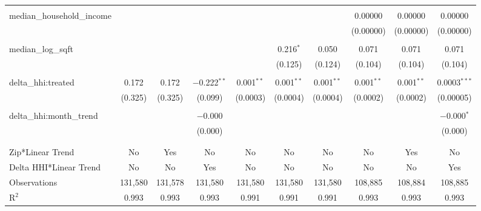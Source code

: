 \begin{table}[H]
{\begin{tabular}{@{\extracolsep{5pt}}lccccccccc}
   & & & & & & & & & \\  

  median\_household\_income &  &  &  &  &  &  & 0.00000 & 0.00000 & 0.00000 \\  

   &  &  &  &  &  &  & (0.00000) & (0.00000) & (0.00000) \\  

   & & & & & & & & & \\  

  median\_log\_sqft &  &  &  &  & 0.216$^{*}$ & 0.050 & 0.071 & 0.071 & 0.071 \\  

   &  &  &  &  & (0.125) & (0.124) & (0.104) & (0.104) & (0.104) \\  

   & & & & & & & & & \\  

  delta\_hhi:treated & 0.172 & 0.172 & $-$0.222$^{**}$ & 0.001$^{**}$ & 0.001$^{**}$ & 0.001$^{**}$ & 0.001$^{**}$ & 0.001$^{**}$ & 0.0003$^{***}$ \\  

   & (0.325) & (0.325) & (0.099) & (0.0003) & (0.0004) & (0.0004) & (0.0002) & (0.0002) & (0.00005) \\  

   & & & & & & & & & \\  

  delta\_hhi:month\_trend &  &  & $-$0.000 &  &  &  &  &  & $-$0.000$^{*}$ \\  

   &  &  & (0.000) &  &  &  &  &  & (0.000) \\  

   & & & & & & & & & \\  

 \hline \\[-1.8ex]  

 Zip*Linear Trend & No & Yes & No & No & No & No & No & Yes & No \\  

 Delta HHI*Linear Trend & No & No & Yes & No & No & No & No & No & Yes \\  

 Observations & 131,580 & 131,578 & 131,580 & 131,580 & 131,580 & 131,580 & 108,885 & 108,884 & 108,885 \\  

 R$^{2}$ & 0.993 & 0.993 & 0.993 & 0.991 & 0.991 & 0.991 & 0.993 & 0.993 & 0.993 \\  


\end{tabular}}
\end{table}
